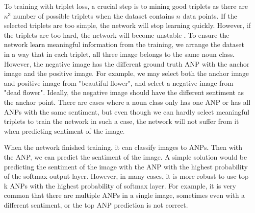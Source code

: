 To training with triplet loss, a crucial step is to mining good triplets as there are $n^3$ number of possible triplets when the dataset contains $n$ data points. If the selected triplets are too simple, the network will stop learning quickly. However, if the triplets are too hard, the network will become unstable \cite{hermans2017defense}. To ensure the network learn meaningful information from the training, we arrange the dataset in a way that in each triplet, all three image belongs to the same noun class. However, the negative image has the different ground truth ANP with the anchor image and the positive image. For example, we may select both the anchor image and positive image from "beautiful flower", and select a negative image from "dead flower". Ideally, the negative image should have the different sentiment as the anchor point. There are cases where a noun class only has one ANP or has all ANPs with the same sentiment, but even though we can hardly select meaningful triplets to train the network in such a case, the network will not suffer from it when predicting sentiment of the image.

When the network finished training, it can classify images to ANPs. Then with the ANP, we can predict the sentiment of the image. A simple solution would be predicting the sentiment of the image with the ANP with the highest probability of the softmax output layer. However, in many cases, it is more robust to use top-k ANPs with the highest probability of softmax layer. For example, it is very common that there are multiple ANPs in a single image, sometimes even with a different sentiment, or the top ANP prediction is not correct. 